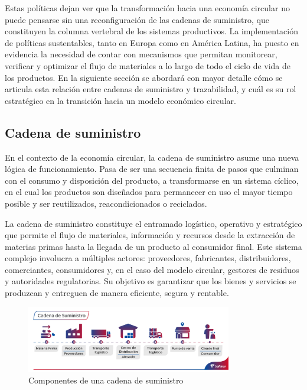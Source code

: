 
Estas políticas dejan ver que la transformación hacia una economía circular no puede pensarse sin una reconfiguración de las cadenas de suministro, que constituyen la columna vertebral de los sistemas productivos. La implementación de políticas sustentables, tanto en Europa como en América Latina, ha puesto en evidencia la necesidad de contar con mecanismos que permitan monitorear, verificar y optimizar el flujo de materiales a lo largo de todo el ciclo de vida de los productos. En la siguiente sección se abordará con mayor detalle cómo se articula esta relación entre cadenas de suministro y trazabilidad, y cuál es su rol estratégico en la transición hacia un modelo económico circular.

\subsection{Cadena de suministro}
\label{sec:supply-chain}

En el contexto de la economía circular, la cadena de suministro asume una nueva lógica de funcionamiento. Pasa de ser una secuencia finita de pasos que culminan con el consumo y disposición del producto, a transformarse en un sistema cíclico, en el cual los productos son diseñados para permanecer en uso el mayor tiempo posible y ser reutilizados, reacondicionados o reciclados. 

La cadena de suministro constituye el entramado logístico, operativo y estratégico que permite el flujo de materiales, información y recursos desde la extracción de materias primas hasta la llegada de un producto al consumidor final. Este sistema complejo involucra a múltiples actores: proveedores, fabricantes, distribuidores, comerciantes, consumidores y, en el caso del modelo circular, gestores de residuos y autoridades regulatorias. Su objetivo es garantizar que los bienes y servicios se produzcan y entreguen de manera eficiente, segura y rentable. 

\begin{figure}[!tb]
    \centering
    \includegraphics[width=0.8\textwidth]{Figures/supply-chain.png}
    \caption{Componentes de una cadena de suministro}
    \label{fig:supply-chain}
\end{figure}


